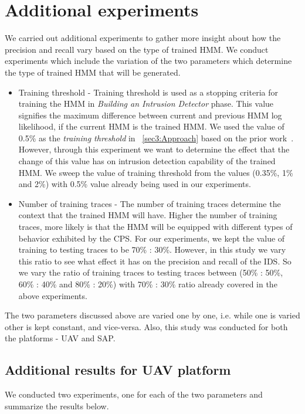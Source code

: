 \section{Additional experiments}
We carried out additional experiments to gather more insight about how the precision and recall vary based on the type of trained \ac{HMM}.
We conduct experiments which include the variation of the two parameters which determine the type of trained \ac{HMM} that will be generated.
\begin{itemize}
\item Training threshold - Training threshold is used as a stopping criteria for training the \ac{HMM} in \textit{Building an Intrusion Detector} phase. This value signifies the maximum difference between current and previous \ac{HMM} log likelihood, if the current \ac{HMM} is the trained \ac{HMM}. We used the value of 0.5\% as the \textit{training threshold} in ~\autoref{sec3:Approach} based on the prior work~\cite{ferrer2000influence}. However, through this experiment we want to determine the effect that the change of this value has on intrusion detection capability of the trained \ac{HMM}. We sweep the value of training threshold from the values (0.35\%, 1\% and 2\%) with 0.5\% value already being used in our experiments.

\item Number of training traces - The number of training traces determine the context that the trained \ac{HMM} will have. Higher the number of training traces, more likely is that the \ac{HMM} will be equipped with different types of behavior exhibited by the \ac{CPS}. For our experiments, we kept the value of training to testing traces to be 70\% : 30\%. However, in this study we vary this ratio to see what effect it has on the precision and recall of the \ac{IDS}. So we vary the ratio of training traces to testing traces between (50\% : 50\%, 60\% : 40\% and 80\% : 20\%) with 70\% : 30\% ratio already covered in the above experiments.
\end{itemize}

The two parameters discussed above are varied one by one, i.e. while one is varied other is kept constant, and vice-versa. Also, this study was conducted for both the platforms - \ac{UAV} and \ac{SAP}.

\subsection{Additional results for UAV platform}
We conducted two experiments, one for each of the two parameters and summarize the results below.

